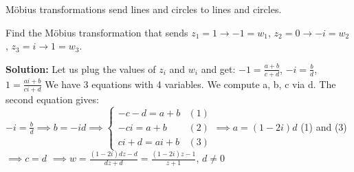 \documentclass[12pt]{article}
\begin{document}
\begin{proposition}
Möbius transformations send lines and circles to lines and circles.
\end{proposition}

\begin{example}
Find the Möbius transformation that sends $z_1 = 1 \to -1 = w_1$, $z_2 = 0 \to -i = w_2$, $z_3 = i \to 1 = w_3$.

\textbf{Solution:} Let us plug the values of $z_i$ and $w_i$ and get:
$-1 = \frac{a+b}{c+d}$, $-i = \frac{b}{d}$, $1 = \frac{ai+b}{ci+d}$
We have 3 equations with 4 variables. We compute a, b, c via d. The second equation gives:
$-i = \frac{b}{d} \implies b = -id \implies \begin{cases} -c-d = a+b & (1)\\ -ci = a+b & (2) \\ ci+d = ai+b & (3) \end{cases}  \implies a = (1-2i)d$
(1) and (3) $\implies c = d$
$\implies w = \frac{(1-2i)dz-d}{dz+d} = \frac{(1-2i)z-1}{z+1}$, $d \neq 0$
\end{example}
\end{document}
